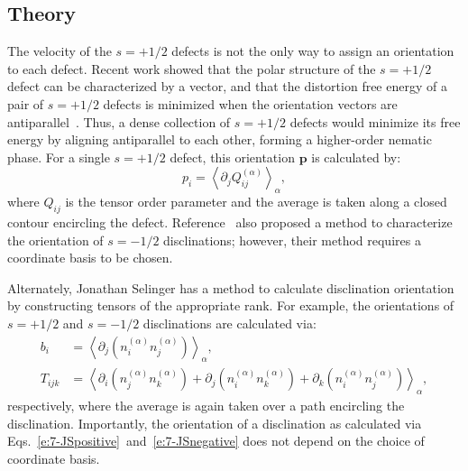 \subsection{Theory}
The velocity of the $s = +1/2$ defects is not the only way to assign an orientation to each defect.
Recent work showed that the polar structure of the $s = +1/2$ defect can be characterized by a vector, and that the distortion free energy of a pair of $s = +1/2$ defects is minimized when the orientation vectors are antiparallel~\cite{RN6}.
Thus, a dense collection of $s = +1/2$ defects would minimize its free energy by aligning antiparallel to each other, forming a higher-order nematic phase.
For a single $s = +1/2$ defect, this orientation $\mathbf{p}$ is calculated by:
\begin{equation}
  p_i = \left \langle \partial_j Q_{ij}^{(\alpha)} \right \rangle_{\alpha},\label{e:7-LGpositive}
\end{equation}
where $Q_{ij}$ is the tensor order parameter and the average is taken along a closed contour encircling the defect.
Reference~\cite{RN6} also proposed a method to characterize the orientation of $s = -1/2$ disclinations; however, their method requires a coordinate basis to be chosen.

Alternately, Jonathan Selinger has a method to calculate disclination orientation by constructing tensors of the appropriate rank.
For example, the orientations of $s = +1/2$ and $s = -1/2$ disclinations are calculated via:
\begin{align}
    b_i &= \left \langle \partial_j (n_{i}^{(\alpha)}n_{j}^{(\alpha)}) \right \rangle_{\alpha},\label{e:7-JSpositive} \\
    T_{ijk} &= \left \langle \partial_i (n_{j}^{(\alpha)}n_{k}^{(\alpha)}) + \partial_j (n_{i}^{(\alpha)}n_{k}^{(\alpha)}) + \partial_k (n_{i}^{(\alpha)}n_{j}^{(\alpha)}) \right \rangle_{\alpha},\label{e:7-JSnegative}
\end{align}
respectively, where the average is again taken over a path encircling the disclination.
Importantly, the orientation of a disclination as calculated via Eqs.~\ref{e:7-JSpositive}~and~\ref{e:7-JSnegative} does not depend on the choice of coordinate basis.

